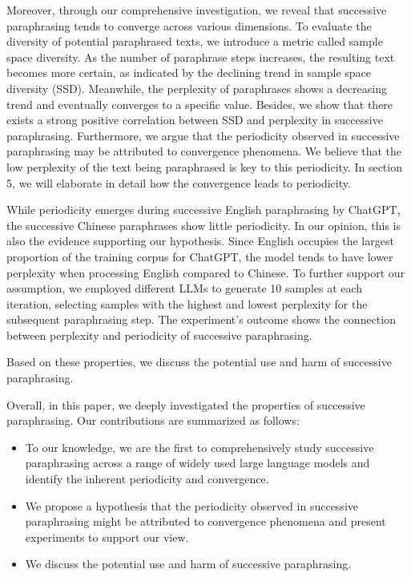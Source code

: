 Moreover, through our comprehensive investigation, we reveal that successive paraphrasing tends to converge across various dimensions. 
To evaluate the diversity of potential paraphrased texts, we introduce a metric called sample space diversity. 
As the number of paraphrase steps increases, the resulting text becomes more certain, as indicated by the declining trend in sample space diversity (SSD). 
Meanwhile, the perplexity of paraphrases shows a decreasing trend and eventually converges to a specific value.
Besides, we show that there exists a strong positive correlation between SSD and perplexity in successive paraphrasing.
Furthermore, we argue that the periodicity observed in successive paraphrasing may be attributed to convergence phenomena. 
We believe that the low perplexity of the text being paraphrased is key to this periodicity.
In section 5, we will elaborate in detail how the convergence leads to periodicity.


While periodicity emerges during successive English paraphrasing by ChatGPT, the successive Chinese paraphrases show little periodicity. 
In our opinion, this is also the evidence supporting our hypothesis.
Since English occupies the largest proportion of the training corpus for ChatGPT, the model tends to have lower perplexity when processing English compared to Chinese.
To further support our assumption, we employed different LLMs to generate 10 samples at each iteration, selecting samples with the highest and lowest perplexity for the subsequent paraphrasing step.
The experiment's outcome shows the connection between perplexity and periodicity of successive paraphrasing.


Based on these properties, we discuss the potential use and harm of successive paraphrasing.




Overall, in this paper, we deeply investigated the properties of successive paraphrasing. Our contributions are summarized as follows:
\begin{itemize}
    \item To our knowledge, we are the first to comprehensively study successive paraphrasing across a range of widely used large language models and identify the inherent periodicity and convergence.
    
    \item We propose a hypothesis that the periodicity observed in successive paraphrasing might be attributed to convergence phenomena and present experiments to support our view.
    \item We discuss the potential use and harm of successive paraphrasing.   
\end{itemize}


